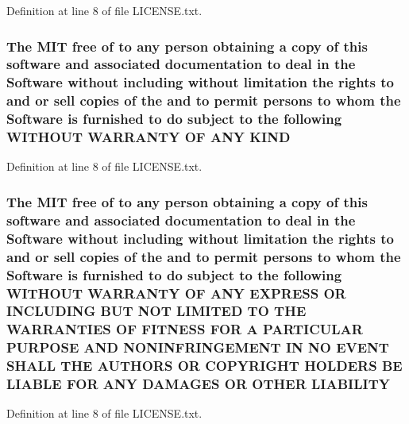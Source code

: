 Definition at line 8 of file L\+I\+C\+E\+N\+S\+E.\+txt.

\subsubsection[{\texorpdfstring{K\+I\+ND}{KIND}}]{\setlength{\rightskip}{0pt plus 5cm}The M\+IT free of to any person obtaining a {\bf copy} of this software and associated documentation to deal in the {\bf Software} without including without limitation the rights to and or sell copies of the and to permit persons to whom the {\bf Software} is furnished to do subject to the following W\+I\+T\+H\+O\+UT W\+A\+R\+R\+A\+N\+TY OF A\+NY K\+I\+ND}\hypertarget{LICENSE_8txt_a8e1a82be600178fe97c0e1339897c260}{}\label{LICENSE_8txt_a8e1a82be600178fe97c0e1339897c260}


Definition at line 8 of file L\+I\+C\+E\+N\+S\+E.\+txt.

\subsubsection[{\texorpdfstring{L\+I\+A\+B\+I\+L\+I\+TY}{LIABILITY}}]{\setlength{\rightskip}{0pt plus 5cm}The M\+IT free of to any person obtaining a {\bf copy} of this software and associated documentation to deal in the {\bf Software} without including without limitation the rights to and or sell copies of the and to permit persons to whom the {\bf Software} is furnished to do subject to the following W\+I\+T\+H\+O\+UT W\+A\+R\+R\+A\+N\+TY OF A\+NY E\+X\+P\+R\+E\+SS OR I\+N\+C\+L\+U\+D\+I\+NG B\+UT N\+OT L\+I\+M\+I\+T\+ED TO T\+HE W\+A\+R\+R\+A\+N\+T\+I\+ES OF F\+I\+T\+N\+E\+SS F\+OR A P\+A\+R\+T\+I\+C\+U\+L\+AR P\+U\+R\+P\+O\+SE A\+ND N\+O\+N\+I\+N\+F\+R\+I\+N\+G\+E\+M\+E\+NT IN NO E\+V\+E\+NT S\+H\+A\+LL T\+HE A\+U\+T\+H\+O\+RS OR C\+O\+P\+Y\+R\+I\+G\+HT H\+O\+L\+D\+E\+RS BE L\+I\+A\+B\+LE F\+OR A\+NY D\+A\+M\+A\+G\+ES OR O\+T\+H\+ER L\+I\+A\+B\+I\+L\+I\+TY}\hypertarget{LICENSE_8txt_a154c0f6f925190567752588d1ff5458f}{}\label{LICENSE_8txt_a154c0f6f925190567752588d1ff5458f}


Definition at line 8 of file L\+I\+C\+E\+N\+S\+E.\+txt.

